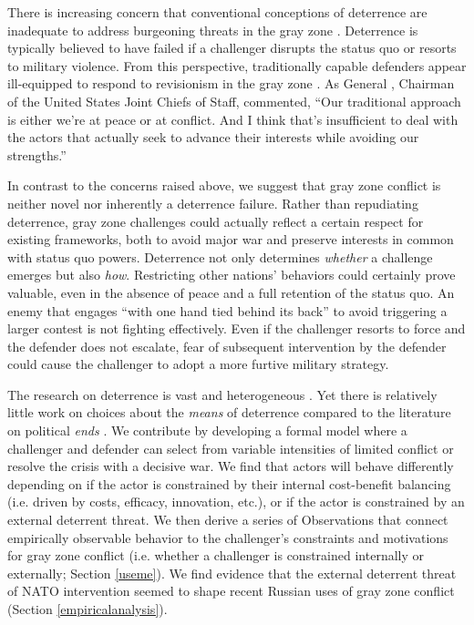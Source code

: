 \documentclass[11pt,letterpaper,pdftex,dvipsnames,table]{article}
\begin{document}
There is increasing concern that conventional conceptions of deterrence are inadequate to address burgeoning threats in the gray zone \citep{holmes_deterringchinagray_2017, matisek_shadesgraydeterrence_2017, hicks_othermeanspart_2019, pettyjohn_competinggrayzone_2019}. Deterrence is typically believed to have failed if a challenger disrupts the status quo or resorts to military violence. From this perspective, traditionally capable defenders appear ill-equipped to respond to revisionism in the gray zone \citep{jackson_tacticsstrategiccompetition_2017}. As General \citet{dunford_gendunfordremarks_2016}, Chairman of the United States Joint Chiefs of Staff, commented, “Our traditional approach is either we’re at peace or at conflict. And I think that’s insufficient to deal with the actors that actually seek to advance their interests while avoiding our strengths.”

In contrast to the concerns raised above, we suggest that gray zone conflict is neither novel nor inherently a deterrence failure. Rather than repudiating deterrence, gray zone challenges could actually reflect a certain respect for existing frameworks, both to avoid major war and preserve interests in common with status quo powers. Deterrence not only determines \textit{whether} a challenge emerges but also \textit{how}. Restricting other nations' behaviors could certainly prove valuable, even in the absence of peace and a full retention of the status quo. An enemy that engages ``with one hand tied behind its back'' to avoid triggering a larger contest is not fighting effectively. Even if the challenger resorts to force and the defender does not escalate, fear of subsequent intervention by the defender could cause the challenger to adopt a more furtive military strategy.

The research on deterrence is vast and heterogeneous \citep{huth_deterrenceinternationalconflict_1999, freedman_deterrence_2004, danilovic_deterrencecrisisbargaining_2010, quackenbush_deterrencetheorywhere_2011}. Yet there is relatively little work on choices about the \textit{means} of deterrence compared to the literature on political \textit{ends} \citep{carcelli_diversificationdeterrencenew_2017}. We contribute by developing a formal model where a challenger and defender can select from variable intensities of limited conflict or resolve the crisis with a decisive war. 
We find that actors will behave differently depending on if the actor is constrained by their internal cost-benefit balancing (i.e. driven by costs, efficacy, innovation, etc.), or if the actor is constrained by an external deterrent threat. We then derive a series of Observations that connect empirically observable behavior to the challenger's constraints and motivations for gray zone conflict (i.e. whether a challenger is constrained internally or externally; Section \ref{useme}). We find evidence that the external deterrent threat of NATO intervention seemed to shape recent Russian uses of gray zone conflict (Section \ref{empiricalanalysis}).
\end{document}
